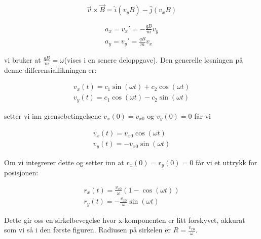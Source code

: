 \documentclass[a4paper,norsk, 10pt]{article}
\begin{document}
$$
\vec{v} \times \vec{B} = \hat{i}(v_yB) - \hat{j}(v_xB)
$$

\begin{equation}
\begin{split}
a_x = v_x' = - \frac{qB}{m}v_y
\\
a_y = v_y' =  \frac{qB}{m}v_x
\end{split}
\end{equation}

vi bruker at $\frac{qB}{m} = \omega$(vises i en senere deloppgave). Den generelle løsningen på denne differensiallikningen er:

\begin{equation}
\begin{split}
v_x(t) = c_1\sin(\omega t) + c_2\cos(\omega t)
\\
v_y(t) = c_1\cos(\omega t) - c_2\sin(\omega t)
\end{split}
\end{equation}

setter vi inn grensebetingelsene $v_x(0) = v_{x0}$ og $v_y(0) = 0$ får vi 

\begin{equation}
\begin{split}
v_x(t) = v_{x0}\cos(\omega t)
\\
v_y(t) = -v_{x0}\sin(\omega t)
\end{split}
\end{equation}

Om vi integrerer dette og setter inn at $r_x(0) = r_y(0) = 0$ får vi et uttrykk for posisjonen:

\begin{equation}
\begin{split}
r_x(t) = \frac{v_{x0}}{\omega}(1-\cos(\omega t))
\\
r_y(t) = -\frac{v_{x0}}{\omega}\sin(\omega t)
\end{split}
\end{equation}

Dette gir oss en sirkelbevegelse hvor x-komponenten er litt forskyvet, akkurat som vi så i den første figuren. Radiusen på sirkelen er $R = \frac{v_{x0}}{\omega}$. 
\end{document}
